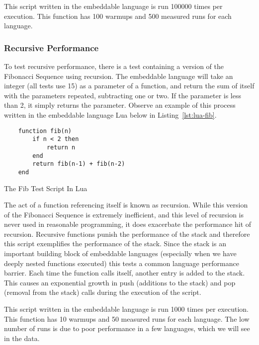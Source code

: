 This script written in the embeddable language is run 100000 times per execution. This function has 100 warmups and 500 measured runs for each language.

\subsubsection{Recursive Performance}
To test recursive performance, there is a test containing a version of the Fibonacci Sequence using recursion. The embeddable language will take an integer (all tests use 15) as a parameter of a function, and return the sum of itself with the parameters repeated, subtracting one or two. If the parameter is less than 2, it simply returns the parameter. Observe an example of this process written in the embeddable language Lua below in Listing~\ref{lst:lua-fib}.

\begin{listing}[H]
    \begin{verbatim}
    function fib(n)
        if n < 2 then
            return n
        end
        return fib(n-1) + fib(n-2)
    end
    \end{verbatim}
    \caption{The Fib Test Script In Lua}
    \label{lst:lua-fib}
\end{listing}

The act of a function referencing itself is known as recursion. While this version of the Fibonacci Sequence is extremely inefficient, and this level of recursion is never used in reasonable programming, it does exacerbate the performance hit of recursion. Recursive functions punish the performance of the stack\cite{recursion:performance} and therefore this script exemplifies the performance of the stack. Since the stack is an important building block of embeddable languages (especially when we have deeply nested functions executed) this tests a common language performance barrier. Each time the function calls itself, another entry is added to the stack. This causes an exponential growth in push (additions to the stack) and pop (removal from the stack) calls during the execution of the script.

This script written in the embeddable language is run 1000 times per execution. This function has 10 warmups and 50 measured runs for each language. The low number of runs is due to poor performance in a few languages, which we will see in the data.

